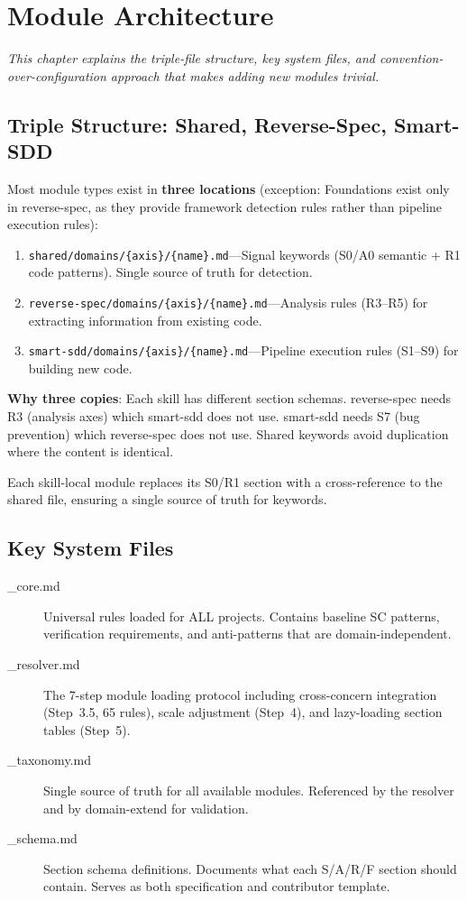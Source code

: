 \documentclass[11pt,a4paper,openright,twoside]{report}
\newcommand{\file}[1]{\texttt{#1}}
\begin{document}
\chapter{Module Architecture}
\label{ch:module-arch}

\textit{This chapter explains the triple-file structure, key system files, and convention-over-configuration approach that makes adding new modules trivial.}

\section{Triple Structure: Shared, Reverse-Spec, Smart-SDD}

Most module types exist in \textbf{three locations} (exception: Foundations exist only in reverse-spec, as they provide framework detection rules rather than pipeline execution rules):

\begin{enumerate}
  \item \file{shared/domains/\{axis\}/\{name\}.md}---Signal keywords (S0/A0 semantic + R1 code patterns). Single source of truth for detection.
  \item \file{reverse-spec/domains/\{axis\}/\{name\}.md}---Analysis rules (R3--R5) for extracting information from existing code.
  \item \file{smart-sdd/domains/\{axis\}/\{name\}.md}---Pipeline execution rules (S1--S9) for building new code.
\end{enumerate}

\textbf{Why three copies}: Each skill has different section schemas. reverse-spec needs R3 (analysis axes) which smart-sdd does not use. smart-sdd needs S7 (bug prevention) which reverse-spec does not use. Shared keywords avoid duplication where the content is identical.

Each skill-local module replaces its S0/R1 section with a cross-reference to the shared file, ensuring a single source of truth for keywords.

\section{Key System Files}

\begin{description}
  \item[\_core.md] Universal rules loaded for ALL projects. Contains baseline SC patterns, verification requirements, and anti-patterns that are domain-independent.
  \item[\_resolver.md] The 7-step module loading protocol including cross-concern integration (Step~3.5, 65 rules), scale adjustment (Step~4), and lazy-loading section tables (Step~5).
  \item[\_taxonomy.md] Single source of truth for all available modules. Referenced by the resolver and by domain-extend for validation.
  \item[\_schema.md] Section schema definitions. Documents what each S/A/R/F section should contain. Serves as both specification and contributor template.
\end{description}
\end{document}
